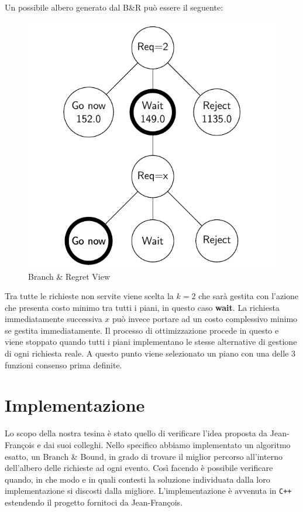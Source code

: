 \documentclass[
    article,            %
    12pt,                %
    oneside,            %
    a4paper,            %
    english,            %
    italian,                %
    sumario=tradicional,
]{abntex2}
\begin{document}
Un possibile albero generato dal B\&R può essere il seguente:

\begin{figure}[h!]
    \centering
    \includegraphics[scale=0.32]{Images/Branch-And-Regret-View.png}
    \caption{Branch \& Regret View}
    \label{fig:Branch-and-RegretView}
\end{figure}

Tra tutte le richieste non servite viene scelta la {\(k=2\)} che sarà gestita con l'azione che presenta costo minimo tra tutti i piani, in questo caso \textbf{wait}. La richiesta immediatamente successiva $x$ può invece portare ad un costo complessivo minimo se gestita immediatamente. Il processo di ottimizzazione procede in questo e viene stoppato quando tutti i piani implementano le stesse alternative di gestione di ogni richiesta reale. A questo punto viene selezionato un piano con una delle 3 funzioni consenso prima definite.

\section{Implementazione}
Lo scopo della nostra tesina è stato quello di verificare l'idea proposta da Jean-François e dai suoi colleghi. Nello specifico abbiamo implementato un algoritmo esatto, un Branch \& Bound, in grado di trovare il miglior percorso all'interno dell'albero delle richieste ad ogni evento. Così facendo è possibile verificare quando, in che modo e in quali contesti la soluzione individuata dalla loro implementazione si discosti dalla migliore. L'implementazione è avvenuta in \texttt{C++} estendendo il progetto fornitoci da Jean-François.
\end{document}
